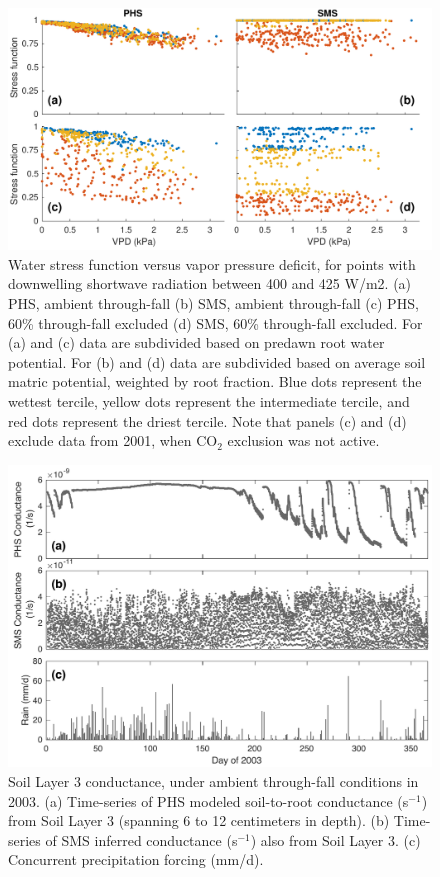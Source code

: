 \documentclass[draft,linenumbers]{agujournal}
\begin{document}
      \clearpage
    \begin{figure}[h]
     \centering
     \includegraphics[width=30pc]{../figs2/fig5.pdf}
     \caption{Water stress function versus vapor pressure deficit, for points with downwelling shortwave radiation between 400 and 425 W/m2.
     (a) PHS, ambient through-fall
     (b) SMS, ambient through-fall
     (c) PHS, 60\% through-fall excluded
     (d) SMS, 60\% through-fall excluded. 
     For (a) and (c) data are subdivided based on predawn root water potential.
     For (b) and (d) data are subdivided based on average soil matric potential, weighted by root fraction.
     Blue dots represent the wettest tercile, yellow dots represent the intermediate tercile, and red dots represent the driest tercile.
     Note that panels (c) and (d) exclude data from 2001, when CO$_2$ exclusion was not active.
     }
     \label{fig:vpd}
       \end{figure}
  
  
\clearpage   
  \begin{figure}[h]
     \centering
     \includegraphics[width=30pc]{../figs2/fig6.pdf}
     \caption{Soil Layer 3 conductance, under ambient through-fall conditions in 2003. 
     (a) Time-series of PHS modeled soil-to-root conductance (s$^{-1}$) from Soil Layer 3 (spanning 6 to 12 centimeters in depth).
     (b) Time-series of SMS inferred conductance (s$^{-1}$) also from Soil Layer 3.
     (c) Concurrent precipitation forcing (mm/d).
     }
     \label{fig:cond}
  \end{figure}
  
\end{document}
